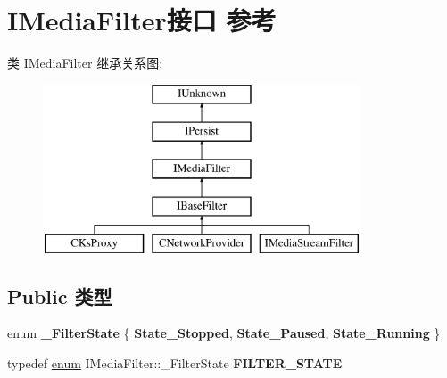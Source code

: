 \hypertarget{interface_i_media_filter}{}\section{I\+Media\+Filter接口 参考}
\label{interface_i_media_filter}
类 I\+Media\+Filter 继承关系图\+:\begin{figure}[H]
\begin{center}
\leavevmode
\includegraphics[height=5.000000cm]{interface_i_media_filter}
\end{center}
\end{figure}
\subsection*{Public 类型}
\begin{DoxyCompactItemize}
\item 
\mbox{\label{interface_i_media_filter_a53c5540495ce7a1990108c40ffb27692}} 
enum {\bfseries \+\_\+\+Filter\+State} \{ {\bfseries State\+\_\+\+Stopped}, 
{\bfseries State\+\_\+\+Paused}, 
{\bfseries State\+\_\+\+Running}
 \}
\item 
\mbox{\label{interface_i_media_filter_a3c65380ad0ecb6b57485438530205220}} 
typedef \hyperlink{interfaceenum}{enum} I\+Media\+Filter\+::\+\_\+\+Filter\+State {\bfseries F\+I\+L\+T\+E\+R\+\_\+\+S\+T\+A\+TE}
\end{DoxyCompactItemize}
